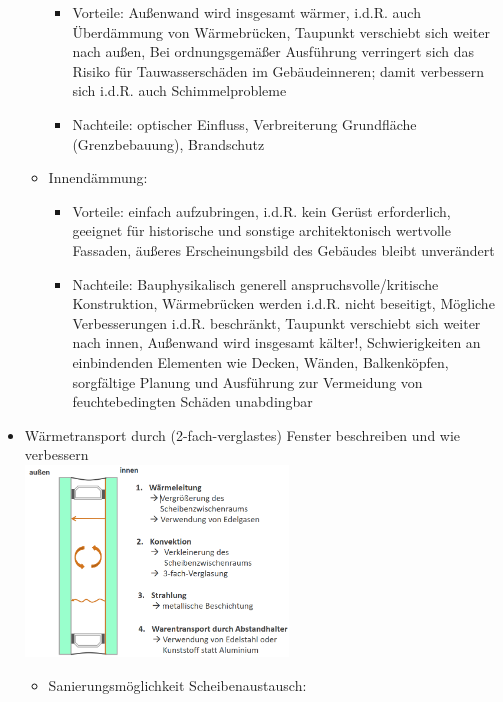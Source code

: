 \documentclass[fleqn,twoside,dvipsnames]{article}
\begin{document}
\begin{itemize}
\begin{itemize}
\begin{itemize}
                            \item Vorteile: Außenwand wird insgesamt wärmer, i.d.R. auch Überdämmung von Wärmebrücken, Taupunkt verschiebt sich weiter nach außen, Bei ordnungsgemäßer Ausführung verringert sich das Risiko für Tauwasserschäden im Gebäudeinneren; damit verbessern sich i.d.R. auch Schimmelprobleme
                            \item Nachteile: optischer Einfluss, Verbreiterung Grundfläche (Grenzbebauung), Brandschutz 
                        \end{itemize}
                        \newpage
                    \item Innendämmung:
                        \begin{itemize}
                            \item Vorteile: einfach aufzubringen, i.d.R. kein Gerüst erforderlich, geeignet für historische und sonstige architektonisch wertvolle Fassaden, äußeres Erscheinungsbild des Gebäudes bleibt unverändert
                            \item Nachteile: Bauphysikalisch generell anspruchsvolle/kritische Konstruktion, Wärmebrücken werden i.d.R. nicht beseitigt, Mögliche Verbesserungen i.d.R. beschränkt, Taupunkt verschiebt sich weiter nach innen, Außenwand wird insgesamt kälter!, Schwierigkeiten an einbindenden Elementen wie Decken, Wänden, Balkenköpfen, sorgfältige Planung und Ausführung zur Vermeidung von feuchtebedingten Schäden unabdingbar
                        \end{itemize}
                \end{itemize}
            \item Wärmetransport durch (2-fach-verglastes) Fenster beschreiben und wie verbessern\\
                \includegraphics[width=0.55\textwidth]{Grafiken/ES/Waermetransport Fensterscheibe.png}
                \begin{itemize}
                    \item Sanierungsmöglichkeit Scheibenaustausch:

\end{itemize}
\end{itemize}
\end{document}
